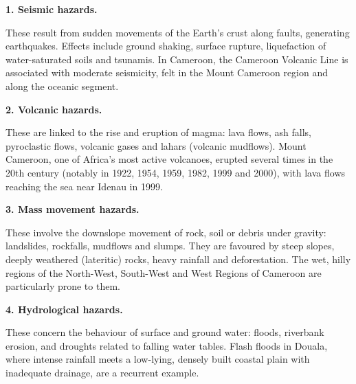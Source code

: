 \documentclass[11pt]{article}
\newcommand{\cle}[1]{{\popxbold\color{popdark}#1}}
\begin{document}
\textbf{1. Seismic hazards.}\par
These result from sudden movements of the Earth's crust along faults, generating \cle{earthquakes}. Effects include ground shaking, surface rupture, liquefaction of water-saturated soils and tsunamis. In Cameroon, the Cameroon Volcanic Line is associated with moderate seismicity, felt in the Mount Cameroon region and along the oceanic segment.

\textbf{2. Volcanic hazards.}\par
These are linked to the rise and eruption of \cle{magma}: lava flows, ash falls, pyroclastic flows, volcanic gases and lahars (volcanic mudflows). Mount Cameroon, one of Africa's most active volcanoes, erupted several times in the 20th century (notably in 1922, 1954, 1959, 1982, 1999 and 2000), with lava flows reaching the sea near Idenau in 1999.

\textbf{3. Mass movement hazards.}\par
These involve the downslope movement of rock, soil or debris under gravity: \cle{landslides}, rockfalls, mudflows and slumps. They are favoured by steep slopes, deeply weathered (lateritic) rocks, heavy rainfall and deforestation. The wet, hilly regions of the North-West, South-West and West Regions of Cameroon are particularly prone to them.

\textbf{4. Hydrological hazards.}\par
These concern the behaviour of surface and ground water: \cle{floods}, riverbank erosion, and droughts related to falling water tables. Flash floods in Douala, where intense rainfall meets a low-lying, densely built coastal plain with inadequate drainage, are a recurrent example.
\end{document}
